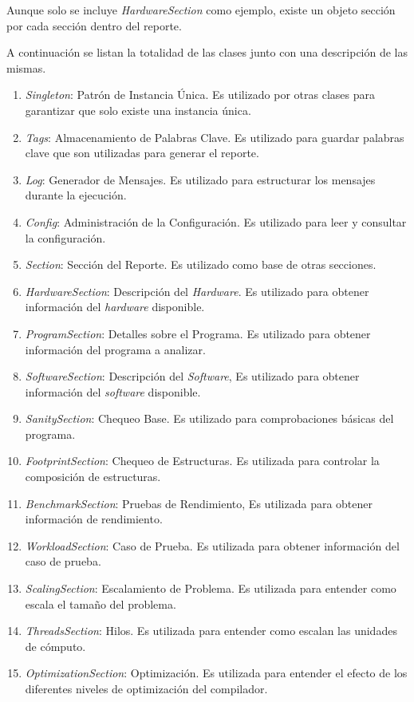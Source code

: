 \documentclass[a4paper]{report}
\begin{document}
Aunque solo se incluye {\it HardwareSection} como ejemplo, existe un objeto sección por cada sección dentro del reporte.

A continuación se listan la totalidad de las clases junto con una descripción de las mismas.

\begin{enumerate}
\item {\it Singleton}: Patrón de Instancia Única. Es utilizado por otras clases para garantizar que solo existe una instancia única.
\item {\it Tags}: Almacenamiento de Palabras Clave. Es utilizado para guardar palabras clave que son utilizadas para generar el reporte.
\item {\it Log}: Generador de Mensajes. Es utilizado para estructurar los mensajes durante la ejecución.
\item {\it Config}: Administración de la Configuración. Es utilizado para leer y consultar la configuración.
\item {\it Section}: Sección del Reporte. Es utilizado como base de otras secciones.
\item {\it HardwareSection}: Descripción del {\it Hardware}. Es utilizado para obtener información del {\it hardware} disponible.
\item {\it ProgramSection}: Detalles sobre el Programa. Es utilizado para obtener información del programa a analizar.
\item {\it SoftwareSection}: Descripción del {\it Software}, Es utilizado para obtener información del {\it software} disponible.
\item {\it SanitySection}: Chequeo Base. Es utilizado para comprobaciones básicas del programa.
\item {\it FootprintSection}: Chequeo de Estructuras. Es utilizada para controlar la composición de estructuras.
\item {\it BenchmarkSection}: Pruebas de Rendimiento, Es utilizada para obtener información de rendimiento.
\item {\it WorkloadSection}: Caso de Prueba. Es utilizada para obtener información del caso de prueba.
\item {\it ScalingSection}: Escalamiento de Problema. Es utilizada para entender como escala el tamaño del problema.
\item {\it ThreadsSection}: Hilos. Es utilizada para entender como escalan las unidades de cómputo.
\item {\it OptimizationSection}: Optimización. Es utilizada para entender el efecto de los diferentes niveles de optimización del compilador.

\end{enumerate}
\end{document}

